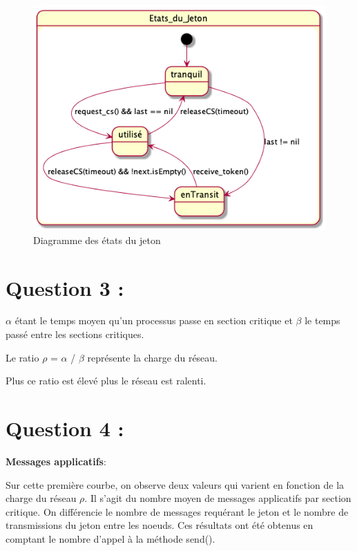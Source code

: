 \documentclass[11pt,a4paper]{report}
\begin{document}
\begin{figure}
	\begin{center}
		\includegraphics[scale=0.4]{../Diagrammes/exercice_1-question_2.png} 
	\end{center}
	\caption{\label{états du jeton} Diagramme des états du jeton}
\end{figure}


\section{Question 3 :}

$\alpha$ étant le temps moyen qu'un processus passe en section critique et $\beta$ le temps passé entre les sections critiques.

Le ratio $\rho$ = $\alpha$ / $\beta$ représente la charge du réseau.

Plus ce ratio est élevé plus le réseau est ralenti.

\section{Question 4 :}

\textbf{Messages applicatifs}:

Sur cette première courbe, on observe deux valeurs qui varient en fonction de la charge du réseau $\rho$. Il s'agit du nombre moyen de messages applicatifs par section critique. On différencie le nombre de messages requérant le jeton et le nombre de transmissions du jeton entre les noeuds. Ces résultats ont été obtenus en comptant le nombre d'appel à la méthode send().\\
\end{document}
